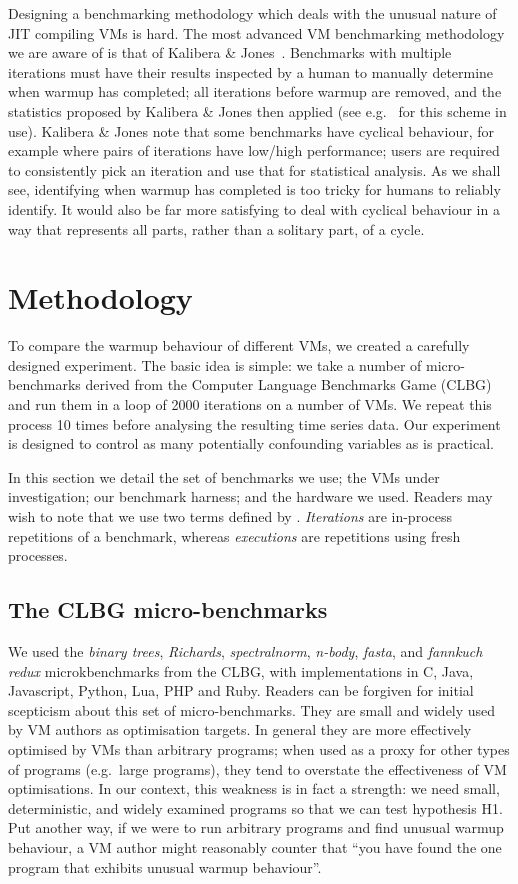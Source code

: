 \documentclass[10pt,preprint]{sigplanconf}
\newcommand{\kalibera}{Kalibera \& Jones\xspace}
\newcommand{\hypone}{H1\xspace}
\newcommand{\binarytrees}{\emph{binary trees}\xspace}
\newcommand{\richards}{\emph{Richards}\xspace}
\newcommand{\spectralnorm}{\emph{spectralnorm}\xspace}
\newcommand{\nbody}{\emph{n-body}\xspace}
\newcommand{\fasta}{\emph{fasta}\xspace}
\newcommand{\fannkuch}{\emph{fannkuch redux}\xspace}
\begin{document}
Designing a benchmarking methodology which deals with the unusual nature of JIT
compiling VMs is hard. The most advanced VM benchmarking methodology we are
aware of is that of \kalibera~\cite{kalibera12quantifying,kalibera13rigorous}.
Benchmarks with multiple iterations must have their results inspected by a human
to manually determine when warmup has completed; all iterations before warmup
are removed, and the statistics proposed by \kalibera then applied (see
e.g.~\cite{barrett15approaches,grimmer15dynamically} for this scheme in use).
\kalibera note that some benchmarks have cyclical behaviour, for example where
pairs of iterations have low/high performance; users are required to
consistently pick an iteration and use that for statistical analysis. As we
shall see, identifying when warmup has completed is too tricky for humans to
reliably identify. It would also be far more satisfying to deal with cyclical
behaviour in a way that represents all parts, rather than a solitary part, of a
cycle.


\section{Methodology}
\label{sec:methodology}

To compare the warmup behaviour of different VMs, we created a carefully
designed experiment. The basic idea is simple: we take a number of
micro-benchmarks derived from the Computer Language Benchmarks Game (CLBG) and
run them in a loop of 2000 iterations on a number of VMs. We repeat this
process 10 times before analysing the resulting time series data. Our
experiment is designed to control as many potentially confounding variables as
is practical.

In this section we detail the set of benchmarks we use; the VMs under
investigation; our benchmark harness;
and the hardware we used. Readers may wish to note that we use two terms defined
by \cite{kalibera13rigorous}. \emph{Iterations} are in-process repetitions of a
benchmark, whereas \emph{executions} are repetitions using fresh processes.


\subsection{The CLBG micro-benchmarks}

We used the \binarytrees, \richards, \spectralnorm, \nbody, \fasta, and
\fannkuch microkbenchmarks from the CLBG, with implementations in C, Java,
Javascript, Python, Lua, PHP and Ruby. Readers can be forgiven for initial scepticism
about this set of micro-benchmarks. They are small and widely
used by VM authors as optimisation targets. In general they are more effectively
optimised by VMs than arbitrary programs; when used as a proxy for other types
of programs (e.g.~large programs), they tend to overstate the effectiveness of
VM optimisations. In our context, this weakness is in fact a strength: we need
small, deterministic, and widely examined programs so that we can test
hypothesis \hypone. Put another way, if we were to run arbitrary programs
and find unusual warmup behaviour, a VM author might reasonably counter that
``you have found the one program that exhibits unusual warmup behaviour''.
\end{document}
